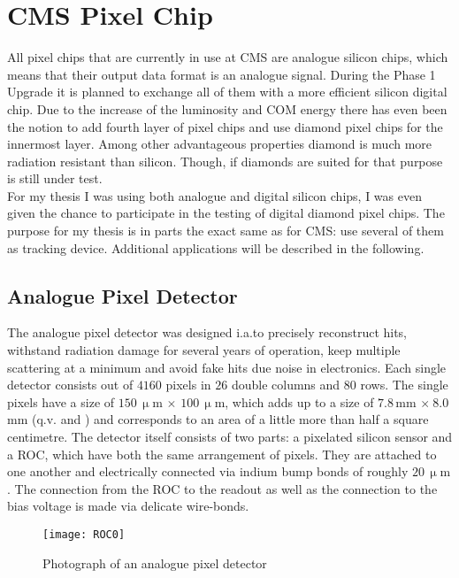 \section{CMS Pixel Chip}\label{s13}
All pixel chips that are currently in use at \ac{CMS} are analogue silicon chips, which means that their output data format is an analogue signal. During the Phase 1 Upgrade it is planned to exchange all of them with a more efficient silicon digital chip. Due to the increase of the luminosity and \ac{COM} energy there has even been the notion to add fourth layer of pixel chips and use diamond pixel chips for the innermost layer. Among other advantageous properties diamond is much more radiation resistant than silicon. Though, if diamonds are suited for that purpose is still under test.\\
For my thesis I was using both analogue and digital silicon chips, I was even given the chance to participate in the testing of digital diamond pixel chips. The purpose for my thesis is in parts the exact same as for \ac{CMS}: use several of them as tracking device. Additional applications will be described in the following.
\subsection{Analogue Pixel Detector}\label{s130}
The analogue pixel detector was designed i.a.to precisely reconstruct hits, withstand radiation damage for several years of operation, keep multiple scattering at a minimum and avoid fake hits due noise in electronics. Each single detector consists out of $4160$ pixels in $26$ double columns and $80$ rows. The single pixels have a size of $150\,\upmu$m $\times$ $100\,\upmu$m, which adds up to a size of $7.8\,$mm $\times\ 8.0\,$mm (q.v.  and ) and corresponds to an area of a little more than half a square centimetre. The detector itself consists of two parts: a pixelated silicon sensor and a \ac{ROC}, which have both the same arrangement of pixels. They are attached to one another and electrically connected via indium bump bonds of roughly $20\,\upmu$m \cite{kaestli}. The connection from the \ac{ROC} to the readout as well as the connection to the bias voltage is made via delicate wire-bonds.
\begin{figure}[ht]
	\centering
	\texttt{[image: ROC0]}
	\caption{Photograph of an analogue pixel detector}
	\label{p24}
\end{figure}
